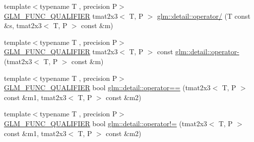 \begin{DoxyCompactItemize}
\item 
{\footnotesize template$<$typename T , precision P$>$ }\\\hyperlink{setup_8hpp_a33fdea6f91c5f834105f7415e2a64407}{G\+L\+M\+\_\+\+F\+U\+N\+C\+\_\+\+Q\+U\+A\+L\+I\+F\+I\+ER} tmat2x3$<$ T, P $>$ \hyperlink{namespaceglm_1_1detail_a92719af6488ee55eeddb478b0d533058}{glm\+::detail\+::operator/} (T const \&s, tmat2x3$<$ T, P $>$ const \&m)
\item 
{\footnotesize template$<$typename T , precision P$>$ }\\\hyperlink{setup_8hpp_a33fdea6f91c5f834105f7415e2a64407}{G\+L\+M\+\_\+\+F\+U\+N\+C\+\_\+\+Q\+U\+A\+L\+I\+F\+I\+ER} tmat2x3$<$ T, P $>$ const \hyperlink{namespaceglm_1_1detail_a40d95a7c315494897aaff724886f8748}{glm\+::detail\+::operator-\/} (tmat2x3$<$ T, P $>$ const \&m)
\item 
{\footnotesize template$<$typename T , precision P$>$ }\\\hyperlink{setup_8hpp_a33fdea6f91c5f834105f7415e2a64407}{G\+L\+M\+\_\+\+F\+U\+N\+C\+\_\+\+Q\+U\+A\+L\+I\+F\+I\+ER} bool \hyperlink{namespaceglm_1_1detail_a302e8c2fd3061ed9d8ac87d6ed23bbc7}{glm\+::detail\+::operator==} (tmat2x3$<$ T, P $>$ const \&m1, tmat2x3$<$ T, P $>$ const \&m2)
\item 
{\footnotesize template$<$typename T , precision P$>$ }\\\hyperlink{setup_8hpp_a33fdea6f91c5f834105f7415e2a64407}{G\+L\+M\+\_\+\+F\+U\+N\+C\+\_\+\+Q\+U\+A\+L\+I\+F\+I\+ER} bool \hyperlink{namespaceglm_1_1detail_a9e5e2b587cf2e73045e67e983a4d718c}{glm\+::detail\+::operator!=} (tmat2x3$<$ T, P $>$ const \&m1, tmat2x3$<$ T, P $>$ const \&m2)
\end{DoxyCompactItemize}
